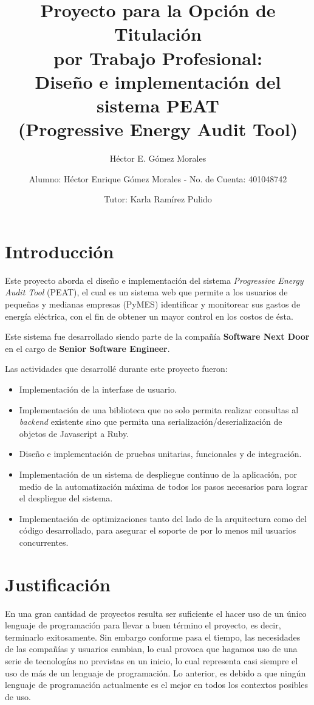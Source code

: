 \documentclass{article}
\author{Héctor E. Gómez Morales}
\title{Proyecto para la Opción de Titulación\\
  por Trabajo Profesional:\\
  Diseño e implementación del sistema PEAT\\
  (Progressive Energy Audit Tool)}
\begin{document}
\author{ Alumno: Héctor Enrique Gómez Morales - No. de Cuenta: 401048742 \and
  Tutor: Karla Ramírez Pulido}
\maketitle
\section{Introducción}
Este proyecto aborda el diseño e implementación del sistema \textit{Progressive
 Energy Audit Tool} (PEAT), el cual es un sistema web que
permite a los usuarios de pequeñas y medianas empresas (PyMES)
identificar y monitorear sus gastos de energía eléctrica, con el fin de obtener
un mayor control en los costos de ésta.

Este sistema fue desarrollado siendo parte de la compañía
\textbf{Software Next Door} en el cargo de \textbf{Senior Software Engineer}.

\vspace{2.5mm}

Las actividades que desarrollé durante este proyecto fueron:
\begin{itemize}
\item Implementación de la interfase de usuario.
\item Implementación de una biblioteca que no solo permita realizar consultas
  al \textit{backend} existente sino que permita una serialización/deserialización
  de objetos de Javascript a Ruby.
\item Diseño e implementación de pruebas unitarias, funcionales y de integración.
\item Implementación de un sistema de despliegue continuo de la aplicación, por
  medio de la automatización máxima de todos los pasos necesarios para lograr
  el despliegue del sistema.
\item Implementación de optimizaciones tanto del lado de la arquitectura como
  del código desarrollado, para asegurar el soporte de por lo menos mil usuarios
  concurrentes.
\end{itemize}

\section{Justificación}
En una gran cantidad de proyectos resulta ser suficiente el hacer uso de un
único lenguaje de programación para llevar a buen término el proyecto, es decir,
terminarlo exitosamente. Sin embargo conforme pasa el tiempo, las necesidades
de las compañías y usuarios cambian, lo cual provoca que hagamos uso de una serie de
tecnologías no previstas en un inicio, lo cual representa casi siempre el uso
de más de un lenguaje de programación. Lo anterior, es debido a que ningún
lenguaje de programación actualmente es el mejor en todos los contextos
posibles de uso.
\end{document}
